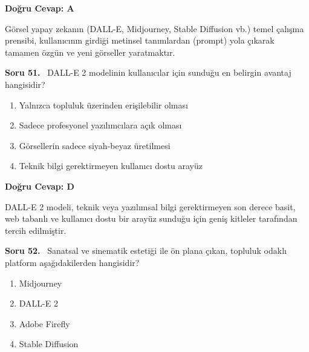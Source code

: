 \documentclass[11pt,a4paper,openany]{book}
\begin{document}
\vspace{4pt}
\begin{tcolorbox}[title=Cevap ve Açıklama, colback=gray!3!white, colframe=primarycolor!90!black, arc=2mm, fonttitle=\bfseries\sffamily, top=6pt, bottom=6pt]
    \textbf{Doğru Cevap: A}

    \vspace{2pt}
    Görsel yapay zekanın (DALL-E, Midjourney, Stable Diffusion vb.) temel çalışma prensibi, kullanıcının girdiği metinsel tanımlardan (prompt) yola çıkarak tamamen özgün ve yeni görseller yaratmaktır.
\end{tcolorbox}
\vspace{10pt}
\needspace{5cm}
\vspace{8pt}
\noindent\textbf{\large\sffamily Soru 51.} \ DALL-E 2 modelinin kullanıcılar için sunduğu en belirgin avantaj hangisidir?

\begin{enumerate}[label=\Alph*), leftmargin=25pt, topsep=4pt, itemsep=2pt]
        \item Yalnızca topluluk üzerinden erişilebilir olması
        \item Sadece profesyonel yazılımcılara açık olması
        \item Görsellerin sadece siyah-beyaz üretilmesi
        \item Teknik bilgi gerektirmeyen kullanıcı dostu arayüz
\end{enumerate}

\vspace{4pt}
\begin{tcolorbox}[title=Cevap ve Açıklama, colback=gray!3!white, colframe=primarycolor!90!black, arc=2mm, fonttitle=\bfseries\sffamily, top=6pt, bottom=6pt]
    \textbf{Doğru Cevap: D}

    \vspace{2pt}
    DALL-E 2 modeli, teknik veya yazılımsal bilgi gerektirmeyen son derece basit, web tabanlı ve kullanıcı dostu bir arayüz sunduğu için geniş kitleler tarafından tercih edilmiştir.
\end{tcolorbox}
\vspace{10pt}
\needspace{5cm}
\vspace{8pt}
\noindent\textbf{\large\sffamily Soru 52.} \ Sanatsal ve sinematik estetiği ile ön plana çıkan, topluluk odaklı platform aşağıdakilerden hangisidir?

\begin{enumerate}[label=\Alph*), leftmargin=25pt, topsep=4pt, itemsep=2pt]
        \item Midjourney
        \item DALL-E 2
        \item Adobe Firefly
        \item Stable Diffusion
\end{enumerate}
\end{document}
